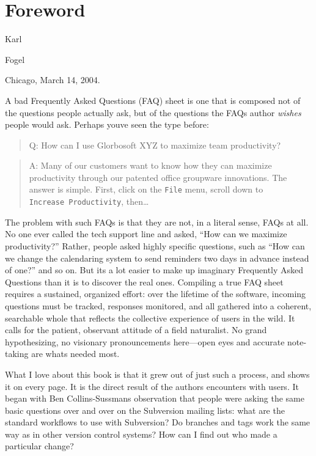 \chapter{Foreword}\label{svn.foreword}

Karl

Fogel

Chicago, March 14, 2004.

A bad Frequently Asked Questions (FAQ) sheet is one that is composed not
of the questions people actually ask, but of the questions the
FAQ\textquotesingle s author \emph{wishes} people would ask. Perhaps
you\textquotesingle ve seen the type before:

\begin{quote}
Q: How can I use Glorbosoft XYZ to maximize team productivity?
\end{quote}

\begin{quote}
A: Many of our customers want to know how they can maximize productivity
through our patented office groupware innovations. The answer is simple.
First, click on the \texttt{File} menu, scroll down to
\texttt{Increase\ Productivity}, then\ldots{}
\end{quote}

The problem with such FAQs is that they are not, in a literal sense,
FAQs at all. No one ever called the tech support line and asked, ``How
can we maximize productivity?'' Rather, people asked highly specific
questions, such as ``How can we change the calendaring system to send
reminders two days in advance instead of one?'' and so on. But
it\textquotesingle s a lot easier to make up imaginary Frequently Asked
Questions than it is to discover the real ones. Compiling a true FAQ
sheet requires a sustained, organized effort: over the lifetime of the
software, incoming questions must be tracked, responses monitored, and
all gathered into a coherent, searchable whole that reflects the
collective experience of users in the wild. It calls for the patient,
observant attitude of a field naturalist. No grand hypothesizing, no
visionary pronouncements here---open eyes and accurate note-taking are
what\textquotesingle s needed most.

What I love about this book is that it grew out of just such a process,
and shows it on every page. It is the direct result of the
authors\textquotesingle{} encounters with users. It began with Ben
Collins-Sussman\textquotesingle s observation that people were asking
the same basic questions over and over on the Subversion mailing lists:
what are the standard workflows to use with Subversion? Do branches and
tags work the same way as in other version control systems? How can I
find out who made a particular change?

